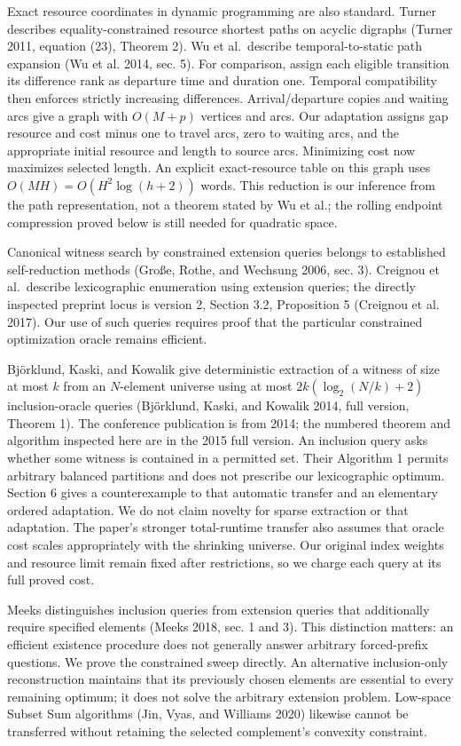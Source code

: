 \documentclass[
  11pt,
  letterpaper,
]{article}
\begin{document}
Exact resource coordinates in dynamic programming are also standard.
Turner describes equality-constrained resource shortest paths on acyclic
digraphs (Turner 2011, equation (23), Theorem 2). Wu et al.~describe
temporal-to-static path expansion (Wu et al. 2014, sec. 5). For
comparison, assign each eligible transition its difference rank as
departure time and duration one. Temporal compatibility then enforces
strictly increasing differences. Arrival/departure copies and waiting
arcs give a graph with \(O(M+p)\) vertices and arcs. Our adaptation
assigns gap resource and cost minus one to travel arcs, zero to waiting
arcs, and the appropriate initial resource and length to source arcs.
Minimizing cost now maximizes selected length. An explicit
exact-resource table on this graph uses \(O(MH)=O(H^2\log(h+2))\) words.
This reduction is our inference from the path representation, not a
theorem stated by Wu et al.; the rolling endpoint compression proved
below is still needed for quadratic space.

Canonical witness search by constrained extension queries belongs to
established self-reduction methods (Große, Rothe, and Wechsung 2006,
sec. 3). Creignou et al.~describe lexicographic enumeration using
extension queries; the directly inspected preprint locus is version 2,
Section 3.2, Proposition 5 (Creignou et al. 2017). Our use of such
queries requires proof that the particular constrained optimization
oracle remains efficient.

Björklund, Kaski, and Kowalik give deterministic extraction of a witness
of size at most \(k\) from an \(N\)-element universe using at most
\(2k(\log_2(N/k)+2)\) inclusion-oracle queries (Björklund, Kaski, and
Kowalik 2014, full version, Theorem 1). The conference publication is
from 2014; the numbered theorem and algorithm inspected here are in the
2015 full version. An inclusion query asks whether some witness is
contained in a permitted set. Their Algorithm 1 permits arbitrary
balanced partitions and does not prescribe our lexicographic optimum.
Section 6 gives a counterexample to that automatic transfer and an
elementary ordered adaptation. We do not claim novelty for sparse
extraction or that adaptation. The paper's stronger total-runtime
transfer also assumes that oracle cost scales appropriately with the
shrinking universe. Our original index weights and resource limit remain
fixed after restrictions, so we charge each query at its full proved
cost.

Meeks distinguishes inclusion queries from extension queries that
additionally require specified elements (Meeks 2018, sec. 1 and 3). This
distinction matters: an efficient existence procedure does not generally
answer arbitrary forced-prefix questions. We prove the constrained sweep
directly. An alternative inclusion-only reconstruction maintains that
its previously chosen elements are essential to every remaining optimum;
it does not solve the arbitrary extension problem. Low-space Subset Sum
algorithms (Jin, Vyas, and Williams 2020) likewise cannot be transferred
without retaining the selected complement's convexity constraint.
\end{document}
